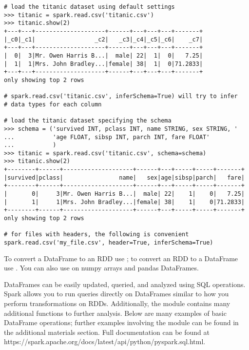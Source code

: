 \begin{lstlisting}
# load the titanic dataset using default settings
>>> titanic = spark.read.csv('titanic.csv')
>>> titanic.show(2)
+---+---+--------------------+------+---+---+---+-------+
|_c0|_c1|                 _c2|   _c3|_c4|_c5|_c6|    _c7|
+---+---+--------------------+------+---+---+---+-------+
|  0|  3|Mr. Owen Harris B...|  male| 22|  1|  0|   7.25|
|  1|  1|Mrs. John Bradley...|female| 38|  1|  0|71.2833|
+---+---+--------------------+------+---+---+---+-------+
only showing top 2 rows

# spark.read.csv('titanic.csv', inferSchema=True) will try to infer
# data types for each column

# load the titanic dataset specifying the schema
>>> schema = ('survived INT, pclass INT, name STRING, sex STRING, '
...			  'age FLOAT, sibsp INT, parch INT, fare FLOAT'
...			  )
>>> titanic = spark.read.csv('titanic.csv', schema=schema)
>>> titanic.show(2)
+--------+------+--------------------+------+---+-----+-----+-------+
|survived|pclass|                name|   sex|age|sibsp|parch|   fare|
+--------+------+--------------------+------+---+-----+-----+-------+
|       0|     3|Mr. Owen Harris B...|  male| 22|    1|    0|   7.25|
|       1|     1|Mrs. John Bradley...|female| 38|    1|    0|71.2833|
+--------+------+--------------------+------+---+-----+-----+-------+
only showing top 2 rows

# for files with headers, the following is convenient
spark.read.csv('my_file.csv', header=True, inferSchema=True)
\end{lstlisting}

\begin{info}
To convert a DataFrame to an RDD use ; to convert an RDD to a DataFrame use . You can also use  on numpy arrays and pandas DataFrames.
\end{info}

DataFrames can be easily updated, queried, and analyzed using SQL operations.
Spark allows you to run queries directly on DataFrames similar to how you perform transformations on RDDs. Additionally, the  module contains many additional functions to further analysis.
Below are many examples of basic DataFrame operations; further examples involving the  module can be found in the additional materials section.
Full documentation can be found at https://spark.apache.org/docs/latest/api/python/pyspark.sql.html.

